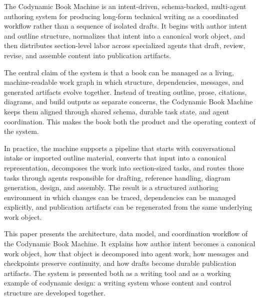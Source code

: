 The Codynamic Book Machine is an intent-driven, schema-backed, multi-agent authoring system for producing long-form technical writing as a coordinated workflow rather than a sequence of isolated drafts. It begins with author intent and outline structure, normalizes that intent into a canonical work object, and then distributes section-level labor across specialized agents that draft, review, revise, and assemble content into publication artifacts.

The central claim of the system is that a book can be managed as a living, machine-readable work graph in which structure, dependencies, messages, and generated artifacts evolve together. Instead of treating outline, prose, citations, diagrams, and build outputs as separate concerns, the Codynamic Book Machine keeps them aligned through shared schema, durable task state, and agent coordination. This makes the book both the product and the operating context of the system.

In practice, the machine supports a pipeline that starts with conversational intake or imported outline material, converts that input into a canonical representation, decomposes the work into section-sized tasks, and routes those tasks through agents responsible for drafting, reference handling, diagram generation, design, and assembly. The result is a structured authoring environment in which changes can be traced, dependencies can be managed explicitly, and publication artifacts can be regenerated from the same underlying work object.

This paper presents the architecture, data model, and coordination workflow of the Codynamic Book Machine. It explains how author intent becomes a canonical work object, how that object is decomposed into agent work, how messages and checkpoints preserve continuity, and how drafts become durable publication artifacts. The system is presented both as a writing tool and as a working example of codynamic design: a writing system whose content and control structure are developed together.
